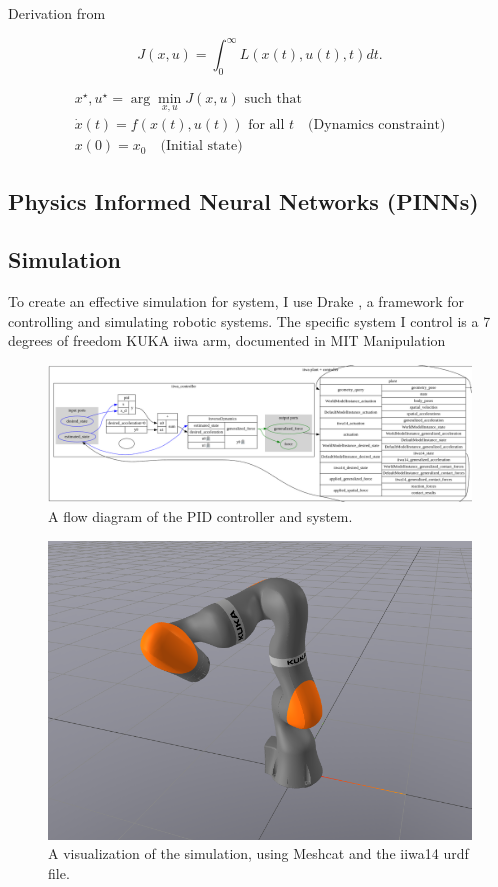 \documentclass[11pt, titlepage]{article}
\begin{document}
Derivation from \cite{Illinois_motion}

\begin{equation}
J(x,u) = \int_0^\infty L(x(t),u(t),t) dt.
\label{eq:CostFunctional}
\end{equation}

\begin{equation}
\begin{gathered}
x^\star, u^\star = \arg \min_{x,u} J(x,u) \text{ such that} \\
\dot{x}(t) = f(x(t),u(t)) \text{ for all }t  \quad \text{(Dynamics constraint)} \\
x(0) = x_0 \quad \text{(Initial state)}
\end{gathered}
\label{eq:OptimalControl}
\end{equation}

\subsection{Physics Informed Neural Networks (PINNs)}
\subsection{Simulation}

To create an effective simulation for system, I use Drake \cite{drake}, a framework for controlling and simulating robotic systems. The specific system I control is a 7 degrees of freedom KUKA iiwa arm, documented in MIT Manipulation \cite{manipulation}

\begin{figure}
\centering
\includegraphics[width=1\linewidth]{diagram.png}
\caption{\label{fig:diagram}A flow diagram of the PID controller and system.}
\end{figure}


\begin{figure}
\centering
\includegraphics[width=0.25\linewidth]{iiwa.png}
\caption{\label{fig:iiwa}A visualization of the simulation, using Meshcat and the iiwa14 urdf file.}
\end{figure}
\end{document}
